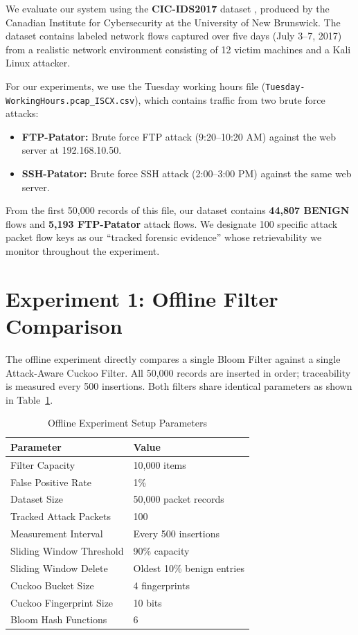 \documentclass[12pt, a4paper]{report}
\begin{document}
We evaluate our system using the \textbf{CIC-IDS2017} dataset
\cite{cicids2017}, produced by the Canadian Institute for Cybersecurity
at the University of New Brunswick. The dataset contains labeled network
flows captured over five days (July 3--7, 2017) from a realistic network
environment consisting of 12 victim machines and a Kali Linux attacker.

For our experiments, we use the Tuesday working hours file
(\texttt{Tuesday-WorkingHours.pcap\_ISCX.csv}), which contains traffic
from two brute force attacks:

\begin{itemize}[leftmargin=*]
  \item \textbf{FTP-Patator:} Brute force FTP attack (9:20--10:20 AM)
  against the web server at 192.168.10.50.
  \item \textbf{SSH-Patator:} Brute force SSH attack (2:00--3:00 PM)
  against the same web server.
\end{itemize}

From the first 50{,}000 records of this file, our dataset contains
\textbf{44{,}807 BENIGN} flows and \textbf{5{,}193 FTP-Patator} attack
flows. We designate 100 specific attack packet flow keys as our ``tracked
forensic evidence'' whose retrievability we monitor throughout the
experiment.

\section{Experiment 1: Offline Filter Comparison}

The offline experiment directly compares a single Bloom Filter against
a single Attack-Aware Cuckoo Filter. All 50{,}000 records are inserted
in order; traceability is measured every 500 insertions. Both filters
share identical parameters as shown in Table~\ref{tab:setup}.

\begin{table}[H]
\centering
\caption{Offline Experiment Setup Parameters}
\label{tab:setup}
\begin{tabular}{ll}
\toprule
\textbf{Parameter} & \textbf{Value} \\
\midrule
Filter Capacity          & 10{,}000 items \\
False Positive Rate      & 1\% \\
Dataset Size             & 50{,}000 packet records \\
Tracked Attack Packets   & 100 \\
Measurement Interval     & Every 500 insertions \\
Sliding Window Threshold & 90\% capacity \\
Sliding Window Delete    & Oldest 10\% benign entries \\
Cuckoo Bucket Size       & 4 fingerprints \\
Cuckoo Fingerprint Size  & 10 bits \\
Bloom Hash Functions     & 6 \\
\bottomrule
\end{tabular}
\end{table}
\end{document}
